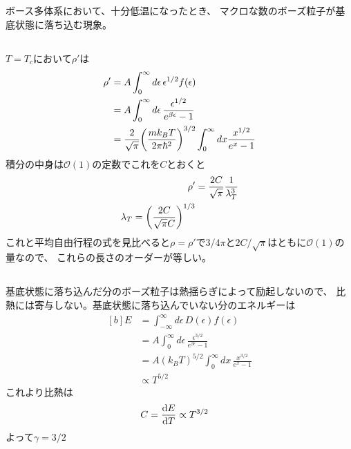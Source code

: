\documentclass[../../master.tex]{subfiles}
\begin{document}
\subsection{}
ボース多体系において、十分低温になったとき、
マクロな数のボーズ粒子が基底状態に落ち込む現象。

\subsection{}
\(T=T_c\)において\(\rho'\)は
\begin{equation}\begin{aligned}[b]
    \rho' &= A\int_{0}^{\infty}d\epsilon\,\epsilon^{1/2}f(\epsilon)\\
    &= A\int_{0}^{\infty}d\epsilon\,\frac{\epsilon^{1/2}}{e^{\beta \epsilon}-1}\\
    &= \frac{2}{\sqrt{\pi}}\qty(\frac{mk_BT}{2\pi\hbar^2})^{3/2}\int_{0}^{\infty}dx\frac{x^{1/2}}{e^x-1}
\end{aligned}\end{equation}
積分の中身は\(\mathcal{O}(1)\)の定数でこれを\(C\)とおくと
\begin{equation}\begin{aligned}[b]
    \rho' &=\frac{2C}{\sqrt{\pi}}\frac{1}{\lambda_T^3}\\
    \lambda_T =\qty(\frac{2C}{\sqrt{\pi}C})^{1/3}
\end{aligned}\end{equation}
これと平均自由行程の式を見比べると\(\rho=\rho'\)で\(3/4\pi\)と\(2C/\sqrt{\pi}\)はともに\(\mathcal{O}(1)\)の量なので、
これらの長さのオーダーが等しい。

\subsection{}
基底状態に落ち込んだ分のボーズ粒子は熱揺らぎによって励起しないので、
比熱には寄与しない。基底状態に落ち込んでいない分のエネルギーは
\begin{equation}\begin{aligned}[b]
    E &= \int_{-\infty}^{\infty}d\epsilon\,D(\epsilon)f(\epsilon)\\
    &= A\int_{0}^{\infty} d\epsilon\,\frac{\epsilon^{3/2}}{e^{\beta\epsilon}-1}\\
    &= A(k_BT)^{5/2}\int_{0}^{\infty} dx\,\frac{x^{3/2}}{e^{x}-1}\\
    &\propto T^{5/2}
\end{aligned}\end{equation}
これより比熱は
\begin{equation}\begin{aligned}[b]
    C &= \dv{E}{T}\propto T^{3/2}
\end{aligned}\end{equation}
よって\(\gamma =3/2\)
\end{document}
